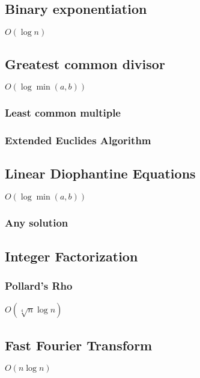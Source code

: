 \documentclass{article}
\begin{document}
\subsection{Binary exponentiation}
$O(\log n)$


\subsection{Greatest common divisor}
$O(\log \min (a, b))$

\subsubsection{Least common multiple}

\subsubsection{Extended Euclides Algorithm}


\subsection{Linear Diophantine Equations}
$O(\log \min (a, b))$
\subsubsection{Any solution}


\subsection{Integer Factorization}
\subsubsection{Pollard's Rho}
$O(\sqrt[4]{n}\log n)$


\subsection{Fast Fourier Transform}
$O(n \log n)$

\end{document}
